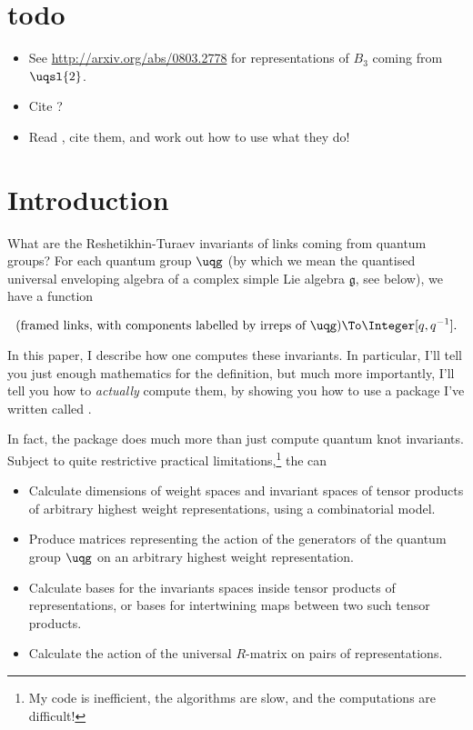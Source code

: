 \section{todo}
\begin{itemize}
\item  See \url{http://arxiv.org/abs/0803.2778} for representations of $B_3$
coming from $\uqsl{2}$.
\item Cite \cite{MR1026957}?
\item Read \cite{MR1099254}, cite them, and work out how to use what they
do!
\end{itemize}

\section{Introduction}
What are the Reshetikhin-Turaev invariants \cite{???} of links coming
from quantum groups? For each quantum group $\uqg$ (by which we mean the
quantised universal enveloping algebra of a complex simple Lie algebra
$\mathfrak{g}$, see below), we have a function

$$(\text{framed links, with components labelled by irreps of $\uqg$}) \To
\Integer[q,q^{-1}].$$

In this paper, I describe how one computes these invariants. In
particular, I'll tell you just enough mathematics for the definition, but
much more importantly, I'll tell you how to \emph{actually} compute them,
by showing you how to use a \MMA package I've written called
.

In fact, the package does much more than just compute quantum knot
invariants. Subject to quite restrictive practical
limitations,\footnote{My code is inefficient, the algorithms are slow,
and the computations are difficult!} the \pkg can
\begin{itemize}
\item Calculate dimensions of weight spaces and invariant spaces of
tensor products of arbitrary highest weight representations, using a
combinatorial model.
\item Produce matrices representing the action of the generators of the quantum group
$\uqg$ on an arbitrary highest weight representation.
\item Calculate bases for the invariants spaces inside tensor
products of representations, or bases for intertwining maps between two
such tensor products.
\item Calculate the action of the universal $R$-matrix on pairs of
representations.
\end{itemize}

